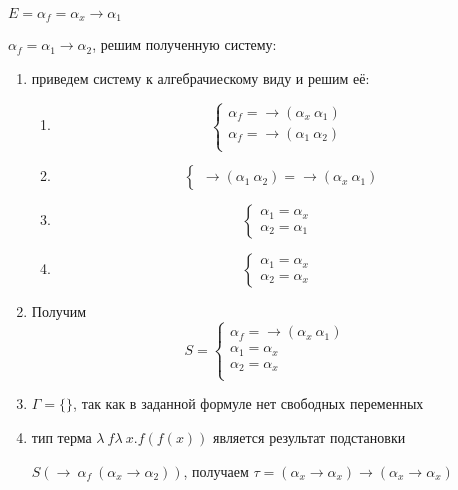 \documentclass[12pt, a4paper]{article}
\begin{document}
	$E=\alpha_f=\alpha_x\rightarrow\alpha_1$\par$\alpha_f=\alpha_1\rightarrow\alpha_2$, решим полученную систему:\par 
	\begin{enumerate}
		\item приведем систему к алгебрачиескому виду и решим её:\par 
			\begin{enumerate}
			\item \[\begin{cases}
				\alpha_f=\rightarrow(\alpha_x\:\alpha_1)&\\
				\alpha_f=\rightarrow(\alpha_1\:\alpha_2)&\\
			\end{cases}\]
			\item \[
				\begin{cases}
				\rightarrow(\alpha_1\:\alpha_2)=\rightarrow(\alpha_x\:\alpha_1)
				\end{cases}\]
			\item \[
				\begin{cases}
				\alpha_1=\alpha_x&\\
				\alpha_2=\alpha_1
				\end{cases}\]
			\item \[
				\begin{cases}
				\alpha_1=\alpha_x&\\
				\alpha_2=\alpha_x
				\end{cases}\]
\end{enumerate}					
		\item  Получим \[S=\begin{cases}
						\alpha_f=\rightarrow(\alpha_x\:\alpha_1)&\\
						\alpha_1=\alpha_x&\\
						\alpha_2=\alpha_x&\\
				\end{cases}\]
		\item $\Gamma=\{\}$, так как в заданной формуле нет свободных переменных
		\item тип  терма $\lambda\:f\lambda\:x.f(f(x))$ является результат подстановки\par $S(\rightarrow\:\alpha_f\:(\alpha_x\rightarrow\alpha_2))$, получаем $\tau=(\alpha_x\rightarrow\alpha_x)\rightarrow(\alpha_x\rightarrow\alpha_x)$
	\end{enumerate}
\end{document}
